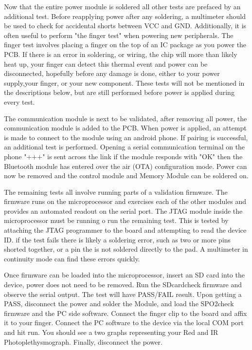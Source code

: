 Now that the entire power module is soldered all other tests are prefaced by an additional test. Before reapplying power after any soldering, a multimeter should be used to check for accidental shorts between VCC and GND. Additionally, it is often useful to perform "the finger test" when powering new peripherals. The finger test involves placing a finger on the top of an IC package as you power the PCB. If there is an error in soldering, or wiring, the chip will more than likely heat up, your finger can detect this thermal event and power can be disconnected, hopefully before any damage is done, either to your power supply,your finger, or your new component. These tests will not be mentioned in the descriptions below, but are still performed before power is applied during every test.

The communication module is next to be validated, after removing all power, the communication module is added to the PCB. When power is applied, an attempt is made to connect to the module using an android phone. If pairing is successful, an additional test is performed. Opening a serial communication terminal on the phone "+++" is sent across the link if the module responds with "OK" then the Bluetooth module has entered over the air (OTA) configuration mode. Power can now be removed and the control module and Memory Module can be soldered on. 

The remaining tests all involve running parts of a validation firmware. The firmware runs on the microprocessor and exercises each of the other modules and provides an automated readout on the serial port. The JTAG module inside the microprocessor must be running o run the remaining test. This is tested by attaching the JTAG programmer to the board and attempting to read the device ID. if the test fails there is likely a soldering error, such as two or more pins shorted together, or a pin the is not soldered directly to the pad. A multimeter in continuity mode can find these errors quickly. 

Once firmware can be loaded into the microprocessor, insert an SD card into the device, power does not need to be removed. Run the SDcardcheck firmware and observe the serial output. The test will have PASS/FAIL result. Upon getting a PASS, disconnect the power and solder the  Module, and load the SPO2check firmware and the PC side software. Connect the finger clip to the board and affix it to your finger. Connect the PC software to the device via the local COM port and hit run. You should see a two graphs representing your Red and IR Photoplethysmograph. Finally, disconnect the power.

